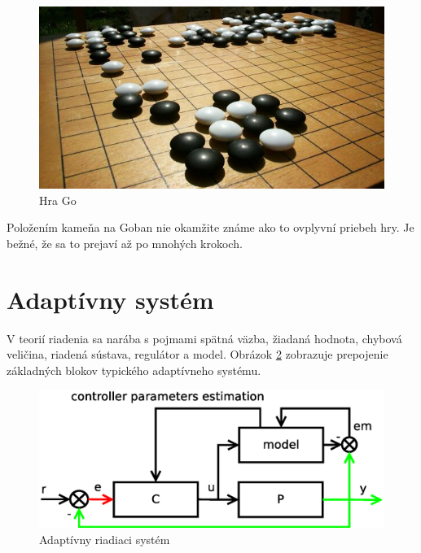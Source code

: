 \begin{figure}[!htb]
\center
\includegraphics[scale=.5]{../pictures/go2.jpg}
\caption{Hra Go}
\label{img:go_game}
\end{figure}

Položením kameňa na Goban nie okamžite známe ako to ovplyvní priebeh hry.
Je bežné, že sa to prejaví až po mnohých krokoch.




















\section{Adaptívny systém}

V teorií riadenia sa narába s pojmami spätná väzba, žiadaná hodnota,
chybová veličina, riadená sústava, regulátor a model. Obrázok \ref{img:adaptive_controll_system} zobrazuje
prepojenie základných blokov typického adaptívneho systému.


\begin{figure}[!htb]
\center
\includegraphics[scale=.6]{../diagrams/adaptive_system.eps}
\caption{Adaptívny riadiaci systém}
\label{img:adaptive_controll_system}
\end{figure}

